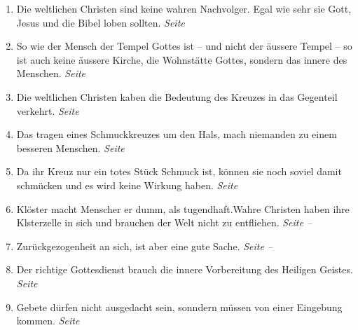 \begin{enumerate}
 \item Die weltlichen Christen sind keine wahren Nachvolger. Egal wie sehr sie
Gott, Jesus und die Bibel loben sollten.
 \dotfill \textit{Seite \pageref{ref:05_05_wahre_nachfolge}}\\
 
 \item So wie der Mensch der Tempel Gottes ist -- und nicht der äussere Tempel
--
 so ist auch keine äussere Kirche, die Wohnstätte Gottes, sondern das innere des
Menschen.
 \dotfill \textit{Seite \pageref{ref:05_06_tempel}}\\
 
 \item Die weltlichen Christen kaben die Bedeutung des Kreuzes in das Gegenteil
verkehrt.
 \dotfill \textit{Seite \pageref{ref:05_07_kreuz}}\\
 
 \item Das tragen eines Schmuckkreuzes um den Hals, mach niemanden zu einem
besseren Menschen.
 \dotfill \textit{Seite \pageref{ref:05_08_kreuz}}\\
 
 \item Da ihr Kreuz nur ein totes Stück Schmuck ist, können sie noch soviel
damit schmücken und es wird keine Wirkung haben.
 \dotfill \textit{Seite \pageref{ref:05_09_kreuz}}\\
 
 \item Klöster macht Menscher er dumm, als tugendhaft.Wahre Christen haben ihre
Klsterzelle in sich und brauchen der Welt nicht zu entfliehen.
 \dotfill \textit{Seite \pageref{ref:05_11_kloster} --
\pageref{ref:05_11_kloster_ende}}\\

 \item Zurückgezogenheit an sich, ist aber eine gute Sache.
 \dotfill \textit{Seite \pageref{ref:05_13_zurueckgezogenheit} --
\pageref{ref:05_13_zurueckgezogenheit_ende}}\\

 \item Der richtige Gottesdienst brauch die innere Vorbereitung des Heiligen
Geistes.
 \dotfill \textit{Seite
\pageref{ref:06_03_gottesdiensvorbereitung}}\\

 \item Gebete dürfen nicht ausgedacht sein, sonndern müssen von einer Eingebung
kommen.
 \dotfill \textit{Seite \pageref{ref:06_04_gebet}}\\
 

\end{enumerate}
